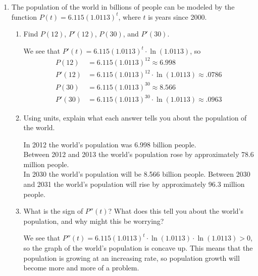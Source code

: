 \documentclass[11pt]{article}
\begin{document}
\begin{enumerate}
\begin{enumerate}
  \end{enumerate}
  \newpage

\item The population of the world in billions of people can be modeled
  by the function $P(t) = 6.115(1.0113)^t$, where $t$ is years since 2000.
  \begin{enumerate}
  \item Find $P(12)$, $P'(12)$, $P(30)$, and $P'(30)$.
    \vfill
    {\color{blue}

      We see that $P'(t) = 6.115(1.0113)^t\cdot \ln(1.0113)$, so
      \begin{align*}
        P(12) &= 6.115(1.0113)^{12} \approx 6.998\\
        P'(12) &= 6.115(1.0113)^{12}\cdot \ln(1.0113) \approx .0786\\
        P(30) &= 6.115(1.0113)^{30} \approx 8.566\\
        P'(30) &= 6.115(1.0113)^{30}\cdot \ln(1.0113) \approx .0963
      \end{align*}

    }
    \vfill

  \item Using units, explain what each answer tells you about the
    population of the world.
    \vfill
    {\color{blue}

      In 2012 the world's population was 6.998 billion people.\\
      Between 2012 and 2013 the world's population rose by approximately 78.6 million people.\\
      In 2030 the world's population will be 8.566 billion people.
      Between 2030 and 2031 the world's population will rise by approximately 96.3 million people.\\


    }
    \vfill

  \item What is the sign of $P''(t)$?  What does this tell you about
    the world's population, and why might this be worrying?
    \vfill
    {\color{blue}

      We see that $P''(t) = 6.115(1.0113)^t\cdot
      \ln(1.0113)\cdot\ln(1.0113) > 0$, so the graph of the world's
      population is concave up. This means that the population is
      growing at an increasing rate, so population growth will become
      more and more of a problem.

    }
    \vfill

  \end{enumerate}


\end{enumerate}
\end{document}
